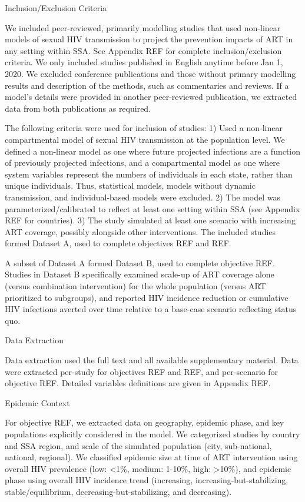 Inclusion/Exclusion Criteria

We included peer-reviewed, primarily modelling studies that used non-linear models of sexual HIV transmission
to project the prevention impacts of ART in any setting within SSA.
See Appendix REF for complete inclusion/exclusion criteria.
We only included studies published in English anytime before Jan 1, 2020.
We excluded conference publications and those without primary modelling results and description of the methods,
such as commentaries and reviews.
If a model's details were provided in another peer-reviewed publication,
we extracted data from both publications as required.

The following criteria were used for inclusion of studies:
1) Used a non-linear compartmental model of sexual HIV transmission at the population level.
We defined a non-linear model as one where
future projected infections are a function of previously projected infections,
and a compartmental model as one where
system variables represent the numbers of individuals in each state,
rather than unique individuals.
Thus, statistical models, models without dynamic transmission, and individual-based models were excluded.
2) The model was parameterized/calibrated to reflect at least one setting within SSA
(see Appendix REF for countries).
3) The study simulated at least one scenario with increasing ART coverage,
possibly alongside other interventions.
The included studies formed Dataset A,
used to complete objectives REF and REF.

A subset of Dataset A formed Dataset B,
used to complete objective REF.
Studies in Dataset B specifically examined
scale-up of ART coverage alone (versus combination intervention)
for the whole population (versus ART prioritized to subgroups),
and reported HIV incidence reduction or cumulative HIV infections averted over time 
relative to a base-case scenario reflecting status quo.

Data Extraction

Data extraction used the full text and all available supplementary material.
Data were extracted per-study for objectives REF and REF, and
per-scenario for objective REF.
Detailed variables definitions are given in Appendix REF.

Epidemic Context

For objective REF, we extracted data on
geography, epidemic phase, and key populations explicitly considered in the model.
We categorized studies by country and SSA region, and
scale of the simulated population (city, sub-national, national, regional).
We classified epidemic size at time of ART intervention using
overall HIV prevalence (low: <1\%, medium: 1-10\%, high: >10\%),
and epidemic phase using overall HIV incidence trend
(increasing, increasing-but-stabilizing, stable/equilibrium, decreasing-but-stabilizing, and decreasing).

